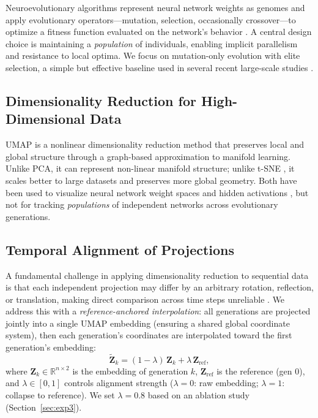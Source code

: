 \documentclass{article}
\begin{document}
Neuroevolutionary algorithms represent neural network weights as
genomes and apply evolutionary operators---mutation, selection,
occasionally crossover---to optimize a fitness function evaluated on
the network's behavior \cite{eiben2015introduction,stanley2002evolving}.
A central design choice is maintaining a \emph{population} of
individuals, enabling implicit parallelism and resistance to local
optima. We focus on mutation-only evolution with elite selection, a
simple but effective baseline used in several recent large-scale studies
\cite{such2017deep,salimans2017evolution}.

\subsection{Dimensionality Reduction for High-Dimensional Data}

UMAP \cite{mcinnes2018umap} is a nonlinear dimensionality reduction
method that preserves local and global structure through a
graph-based approximation to manifold learning. Unlike PCA, it can
represent non-linear manifold structure; unlike t-SNE
\cite{vandermaaten2008}, it scales better to large datasets and
preserves more global geometry. Both have been used to visualize
neural network weight spaces \cite{li2018visualizing,goodfellow2015qualitatively} and hidden
activations \cite{rauber2017visualizing,cantareira2020exploring, grisci2025assessing}, but not for tracking
\emph{populations} of independent networks across evolutionary generations.

\subsection{Temporal Alignment of Projections}

A fundamental challenge in applying dimensionality reduction to
sequential data is that each independent projection may differ by an
arbitrary rotation, reflection, or translation, making direct
comparison across time steps unreliable \cite{mcinnes2020aligned}. We
address this with a \emph{reference-anchored interpolation}: all
generations are projected jointly into a single UMAP embedding (ensuring
a shared global coordinate system), then each generation's coordinates
are interpolated toward the first generation's embedding:
\begin{equation}
  \tilde{\mathbf{Z}}_k = (1 - \lambda)\,\mathbf{Z}_k + \lambda\,\mathbf{Z}_{\mathrm{ref}},
  \label{eq:alignment}
\end{equation}
where $\mathbf{Z}_k \in \mathbb{R}^{n \times 2}$ is the embedding of
generation $k$, $\mathbf{Z}_{\mathrm{ref}}$ is the reference (gen 0),
and $\lambda \in [0, 1]$ controls alignment strength ($\lambda=0$: raw
embedding; $\lambda=1$: collapse to reference). We set $\lambda = 0.8$
based on an ablation study (Section~\ref{sec:exp3}).
\end{document}
